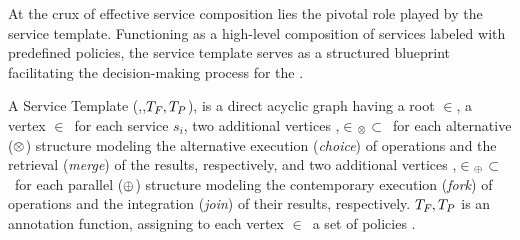At the crux of effective service composition lies the pivotal role played by the service template.
Functioning as a high-level composition of services labeled with predefined policies,
the service template serves as a structured blueprint facilitating the decision-making process for the  \user.
\begin{definition} \label{def:pipeline}
  A Service Template \T(\V,\E,$T_{F_{}},T_P{}$), is a direct acyclic graph having a root $\in$\V, a vertex $\in$\V\ for each service $s_i$,
  two additional vertices ,$\in$\V$_{\otimes}$$\subset$\V\ for each alternative ($\otimes$) structure modeling the alternative execution (\emph{choice}) of operations and the retrieval (\emph{merge}) of the results,
        respectively, and two additional vertices ,$\in$\V$_{\oplus}$$\subset$\V\ for each parallel ($\oplus$) structure modeling the contemporary execution (\emph{fork}) of operations and the integration (\emph{join}) of their results, respectively. $T_{F_{}},T_P{}$ is an annotation function, assigning to each vertex $\in$\V\ a set of policies .
\end{definition}





